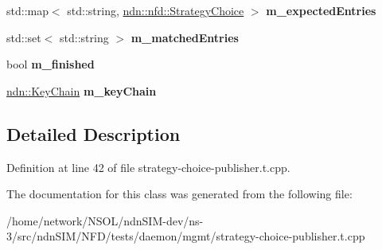 \begin{DoxyCompactItemize}
\item 
std\+::map$<$ std\+::string, \hyperlink{classndn_1_1nfd_1_1StrategyChoice}{ndn\+::nfd\+::\+Strategy\+Choice} $>$ {\bfseries m\+\_\+expected\+Entries}\hypertarget{classnfd_1_1tests_1_1StrategyChoicePublisherFixture_a46ae0a9519c67e7913ba91e52c2e4bbf}{}\label{classnfd_1_1tests_1_1StrategyChoicePublisherFixture_a46ae0a9519c67e7913ba91e52c2e4bbf}

\item 
std\+::set$<$ std\+::string $>$ {\bfseries m\+\_\+matched\+Entries}\hypertarget{classnfd_1_1tests_1_1StrategyChoicePublisherFixture_a6aec3aa96cc8aa1898aedad3af8c4f96}{}\label{classnfd_1_1tests_1_1StrategyChoicePublisherFixture_a6aec3aa96cc8aa1898aedad3af8c4f96}

\item 
bool {\bfseries m\+\_\+finished}\hypertarget{classnfd_1_1tests_1_1StrategyChoicePublisherFixture_a4a44a085c86300e7f9de26ba838b3dbd}{}\label{classnfd_1_1tests_1_1StrategyChoicePublisherFixture_a4a44a085c86300e7f9de26ba838b3dbd}

\item 
\hyperlink{classndn_1_1security_1_1KeyChain}{ndn\+::\+Key\+Chain} {\bfseries m\+\_\+key\+Chain}\hypertarget{classnfd_1_1tests_1_1StrategyChoicePublisherFixture_ac34ae8adcb301e0c1ecd5e4fc2de7504}{}\label{classnfd_1_1tests_1_1StrategyChoicePublisherFixture_ac34ae8adcb301e0c1ecd5e4fc2de7504}

\end{DoxyCompactItemize}


\subsection{Detailed Description}


Definition at line 42 of file strategy-\/choice-\/publisher.\+t.\+cpp.



The documentation for this class was generated from the following file\+:\begin{DoxyCompactItemize}
\item 
/home/network/\+N\+S\+O\+L/ndn\+S\+I\+M-\/dev/ns-\/3/src/ndn\+S\+I\+M/\+N\+F\+D/tests/daemon/mgmt/strategy-\/choice-\/publisher.\+t.\+cpp\end{DoxyCompactItemize}
